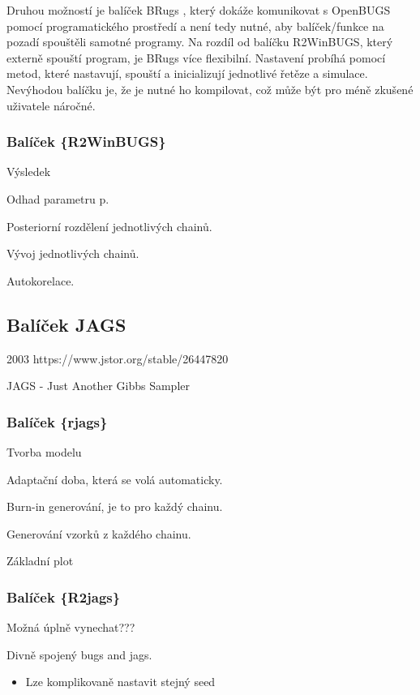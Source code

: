 \documentclass[
  11pt,
  a4paper]{report}
\providecommand{\tightlist}{%
  \setlength{\itemsep}{0pt}\setlength{\parskip}{0pt}}\usepackage{longtable,booktabs,array}
\begin{document}
Druhou možností je balíček BRugs
\parencite{ThomasEtAl2006_MakingBUGSOpen}, který dokáže komunikovat s
OpenBUGS pomocí programatického prostředí a není tedy nutné, aby
balíček/funkce na pozadí spouštěli samotné programy. Na rozdíl od
balíčku R2WinBUGS, který externě spouští program, je BRugs více
flexibilní. Nastavení probíhá pomocí metod, které nastavují, spouští a
inicializují jednotlivé řetěze a simulace. Nevýhodou balíčku je, že je
nutné ho kompilovat, což může být pro méně zkušené uživatele náročné.

\subsubsection{Balíček \{R2WinBUGS\}}\label{baluxedux10dek-r2winbugs}

Výsledek

Odhad parametru p.

Posteriorní rozdělení jednotlivých chainů.

Vývoj jednotlivých chainů.

Autokorelace.

\subsection{Balíček JAGS}\label{baluxedux10dek-jags}

2003 https://www.jstor.org/stable/26447820

JAGS - Just Another Gibbs Sampler

\subsubsection{Balíček \{rjags\}}\label{baluxedux10dek-rjags}

Tvorba modelu

Adaptační doba, která se volá automaticky.

Burn-in generování, je to pro každý chainu.

Generování vzorků z každého chainu.

Základní plot

\subsubsection{Balíček \{R2jags\}}\label{baluxedux10dek-r2jags}

Možná úplně vynechat???

Divně spojený bugs and jags.

\begin{itemize}
\tightlist
\item
  Lze komplikovaně nastavit stejný seed
\end{itemize}
\end{document}
